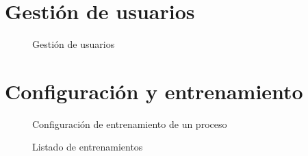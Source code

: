 {\section{Gestión de usuarios}
\begin{figure}[H]
\centering
 \caption{Gestión de usuarios}
 \label{fig:gestionUss} 
\end{figure}


\section{Configuración y entrenamiento}
\begin{figure}[H]
\centering
 \caption{Configuración de entrenamiento de un proceso}
 \label{fig:confEn} 
\end{figure}

\begin{figure}[H]
\centering
 \caption{Listado de entrenamientos}
 \label{fig:entrenamientos} 
\end{figure}

}
